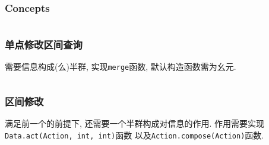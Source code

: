 \subsubsection{Concepts}
\inputminted{cpp}{DataStructure/segtree_concept.cpp}
\subsubsection{单点修改区间查询}
需要信息构成(么)半群, 实现\texttt{merge}函数, 默认构造函数需为幺元.
\inputminted{cpp}{DataStructure/segtree_simple.cpp}
\subsubsection{区间修改}
满足前一个的前提下, 还需要一个半群构成对信息的作用.
作用需要实现\texttt{Data.act(Action, int, int)}函数
以及\texttt{Action.compose(Action)}函数.
\inputminted{cpp}{DataStructure/segtree_rc.cpp}